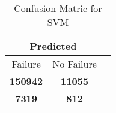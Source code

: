 \begin{table}[] 
\caption{Confusion Matric for SVM} 
\label{Table: Prediction Accuracy-DMDSVM100.0EKF-ignoreReflection-Reflection} 
\centering 
\begin{tabular} 
 {@{}ccc@{}} 
\toprule 
\multicolumn{2}{c}{\textbf{Predicted}}
 \\ \midrule 
\multicolumn{1}{|c|}{Failure} & 
\multicolumn{1}{c|}{No Failure}
 \\ \midrule 
\multicolumn{1}{|c|}{\color{green}\textbf{150942}} & 
\multicolumn{1}{c|}{\color{green}\textbf{11055}}
 \\ \midrule 
\multicolumn{1}{|c|}{\color{red}\textbf{7319}} & 
\multicolumn{1}{c|}{\color{red}\textbf{812}}
 \\ \bottomrule 
\end{tabular} 
\end{table} 
